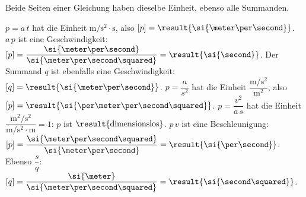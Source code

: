 Beide Seiten einer Gleichung haben dieselbe Einheit, ebenso alle Summanden.
\begin{abcliste}
\abc $p = a\,t$ hat die Einheit $\si{\meter\per\second\squared}\cdot\si{\second}$, also $[p] = \result{\si{\meter\per\second}}$.
\abc $a\,p$ ist eine Geschwindigkeit: $[p] = \dfrac{\si{\meter\per\second}}{\si{\meter\per\second\squared}} = \result{\si{\second}}$. Der Summand $q$ ist ebenfalls eine Geschwindigkeit: $[q] = \result{\si{\meter\per\second}}$.
\abc $p = \dfrac{a}{s^2}$ hat die Einheit $\dfrac{\si{\meter\per\second\squared}}{\si{\meter\squared}}$, also $[p] = \result{\si{\per\meter\per\second\squared}}$.
\abc $p = \dfrac{v^2}{a\,s}$ hat die Einheit $\dfrac{\si{\meter\squared\per\second\squared}}{\si{\meter\per\second\squared}\cdot\si{\meter}} = 1$: $p$ ist $\result{\text{dimensionslos}}$.
\abc $p\,v$ ist eine Beschleunigung: $[p] = \dfrac{\si{\meter\per\second\squared}}{\si{\meter\per\second}} = \result{\si{\per\second}}$. Ebenso $\dfrac{s}{q}$: $[q] = \dfrac{\si{\meter}}{\si{\meter\per\second\squared}} = \result{\si{\second\squared}}$.
\end{abcliste}
